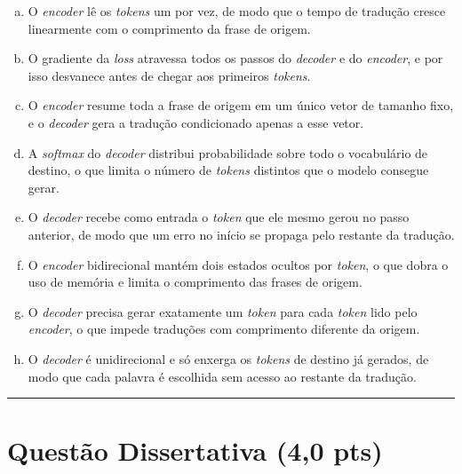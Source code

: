 \documentclass[11pt,a4paper]{article}
\begin{document}
\begin{enumerate}[1)]
\begin{enumerate}[a)]
    \item O \textit{encoder} lê os \textit{tokens} um por vez, de modo que o tempo de tradução cresce linearmente com o comprimento da frase de origem.
    \item O gradiente da \textit{loss} atravessa todos os passos do \textit{decoder} e do \textit{encoder}, e por isso desvanece antes de chegar aos primeiros \textit{tokens}.
    \item O \textit{encoder} resume toda a frase de origem em um único vetor de tamanho fixo, e o \textit{decoder} gera a tradução condicionado apenas a esse vetor.
    \item A \textit{softmax} do \textit{decoder} distribui probabilidade sobre todo o vocabulário de destino, o que limita o número de \textit{tokens} distintos que o modelo consegue gerar.
    \item O \textit{decoder} recebe como entrada o \textit{token} que ele mesmo gerou no passo anterior, de modo que um erro no início se propaga pelo restante da tradução.
    \item O \textit{encoder} bidirecional mantém dois estados ocultos por \textit{token}, o que dobra o uso de memória e limita o comprimento das frases de origem.
    \item O \textit{decoder} precisa gerar exatamente um \textit{token} para cada \textit{token} lido pelo \textit{encoder}, o que impede traduções com comprimento diferente da origem.
    \item O \textit{decoder} é unidirecional e só enxerga os \textit{tokens} de destino já gerados, de modo que cada palavra é escolhida sem acesso ao restante da tradução.
\end{enumerate}

\end{enumerate}

\rule{\linewidth}{0.4pt}

\pagebreak
\section*{Questão Dissertativa (4{,}0 pts)}
\end{document}

